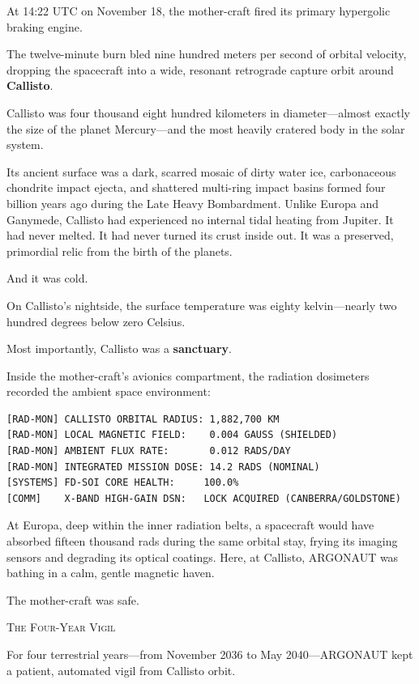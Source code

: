 \documentclass[12pt,twoside,openright]{book}
\newcommand{\sceneheader}[1]{%
  \par\vspace{1.8em}%
  {\noindent\centering\scshape\large #1\par}%
  \vspace{1.0em}%
  \noindent%
}
\newcommand{\dinkus}{%
  \par\vspace{1.2em}%
  {\noindent\centering{\large $\ast\quad\ast\quad\ast$}\par}%
  \vspace{1.2em}%
  \noindent%
}
\begin{document}
At 14:22 UTC on November 18, the mother-craft fired its primary
hypergolic braking engine.

The twelve-minute burn bled nine hundred meters per second of orbital
velocity, dropping the spacecraft into a wide, resonant retrograde
capture orbit around \textbf{Callisto}.

Callisto was four thousand eight hundred kilometers in diameter---almost
exactly the size of the planet Mercury---and the most heavily cratered
body in the solar system.

Its ancient surface was a dark, scarred mosaic of dirty water ice,
carbonaceous chondrite impact ejecta, and shattered multi-ring impact
basins formed four billion years ago during the Late Heavy Bombardment.
Unlike Europa and Ganymede, Callisto had experienced no internal tidal
heating from Jupiter. It had never melted. It had never turned its crust
inside out. It was a preserved, primordial relic from the birth of the
planets.

And it was cold.

On Callisto's nightside, the surface temperature was eighty
kelvin---nearly two hundred degrees below zero Celsius.

Most importantly, Callisto was a \textbf{sanctuary}.

Inside the mother-craft's avionics compartment, the radiation dosimeters
recorded the ambient space environment:

\begin{lstlisting}
[RAD-MON] CALLISTO ORBITAL RADIUS: 1,882,700 KM
[RAD-MON] LOCAL MAGNETIC FIELD:    0.004 GAUSS (SHIELDED)
[RAD-MON] AMBIENT FLUX RATE:       0.012 RADS/DAY
[RAD-MON] INTEGRATED MISSION DOSE: 14.2 RADS (NOMINAL)
[SYSTEMS] FD-SOI CORE HEALTH:     100.0%
[COMM]    X-BAND HIGH-GAIN DSN:   LOCK ACQUIRED (CANBERRA/GOLDSTONE)
\end{lstlisting}

At Europa, deep within the inner radiation belts, a spacecraft would
have absorbed fifteen thousand rads during the same orbital stay, frying
its imaging sensors and degrading its optical coatings. Here, at
Callisto, ARGONAUT was bathing in a calm, gentle magnetic haven.

The mother-craft was safe.

\dinkus

\sceneheader{The Four-Year Vigil}

For four terrestrial years---from November 2036 to May 2040---ARGONAUT
kept a patient, automated vigil from Callisto orbit.
\end{document}
